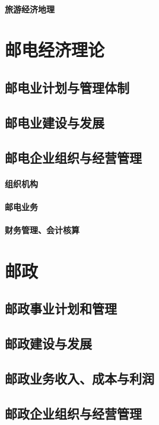 \documentclass[UTF8]{../../RepresentationUniverse}
\begin{document}
    \subsubsection{旅游经济地理}









\chapter{邮电经济理论}
\section{邮电业计划与管理体制}
\section{邮电业建设与发展}
\section{邮电企业组织与经营管理}
    \subsubsection{组织机构}
    \subsubsection{邮电业务}
    \subsubsection{财务管理、会计核算}


\chapter{邮政}
    \section{邮政事业计划和管理}
    \section{邮政建设与发展}
    \section{邮政业务收入、成本与利润}
    \section{邮政企业组织与经营管理}
\end{document}
